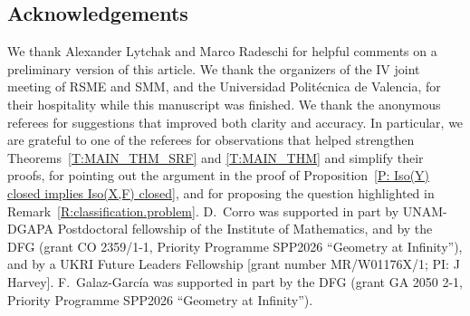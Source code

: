 \documentclass[pdftex]{sigma}
\numberwithin{equation}{section}
\theoremstyle{definition}
\begin{document}
\subsection*{Acknowledgements}
We thank Alexander Lytchak and Marco Radeschi for helpful comments on a preliminary version of this article. We thank the organizers of the IV joint meeting of RSME and SMM, and the Universidad Polit\'ecnica de Valencia, for their hospitality while this manuscript was finished. We thank the anonymous referees for suggestions that improved both clarity and accuracy. In particular, we are grateful to one of the referees for observations that helped strengthen Theorems~\ref{T:MAIN_THM_SRF} and \ref{T:MAIN_THM} and simplify their proofs, for pointing out the argument in the proof of Proposition~\ref{P: Iso(Y) closed implies Iso(X,F) closed}, and for proposing the question highlighted in Remark~\ref{R:classification.problem}.
D.~Corro was supported in part by UNAM-DGAPA Postdoctoral fellowship of the Institute of Mathematics, and by the DFG (grant CO 2359/1-1, Priority Programme SPP2026 ``Geometry at Infinity''), and by a UKRI Future Leaders Fellowship [grant number MR/W01176X/1; PI: J Harvey].
F.~Galaz-Garc\'ia was supported in part by the DFG (grant GA 2050 2-1, Priority Programme SPP2026 ``Geometry at Infinity'').
\end{document}
